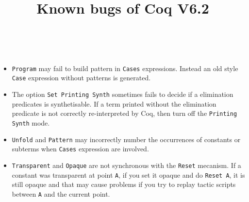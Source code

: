 \documentclass[11pt]{article}
\title{Known bugs of {\sf Coq} V6.2}
\author{\ }
\begin{document}
\maketitle

\begin{itemize}

\item {\tt Program} may fail to build pattern in {\tt Cases}
expressions. Instead an old style {\tt Case} expression without
patterns is generated.

\item The option {\tt Set Printing Synth} sometimes fails to decide if
a elimination predicates is synthetisable. If a term printed without
the elimination predicate is not correctly re-interpreted by Coq, then
turn off the {\tt Printing Synth} mode.

\item {\tt Unfold} and {\tt Pattern} may incorrectly number the
occurrences of constants or subterms when {\tt Cases} expression are involved.

\item \texttt{Transparent} and \texttt{Opaque} are not synchronous
  with the \texttt{Reset} mecanism. If a constant was transparent at
  point \texttt{A}, if you set it opaque and do \texttt{Reset A}, it
  is still opaque and that may cause problems if you try to replay
  tactic scripts between \texttt{A} and the current point.
 
\end{itemize}
\end{document}
